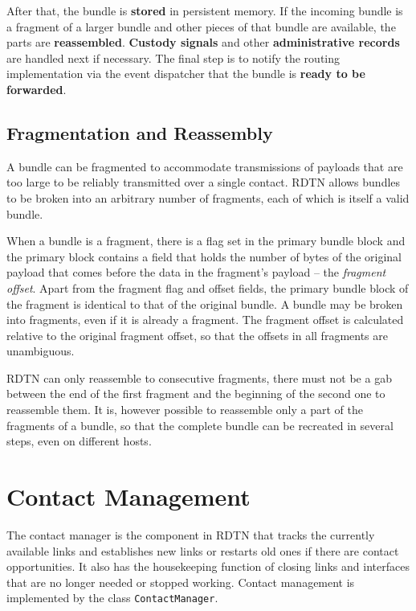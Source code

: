 \documentclass{article}
\begin{document}
After that, the bundle is {\bf stored} in persistent memory. If the incoming
bundle is a fragment of a larger bundle and other pieces of that bundle are
available, the parts are {\bf reassembled}. {\bf Custody signals} and other {\bf
administrative records} are handled next if necessary. The final step is to
notify the routing implementation via the event dispatcher that the bundle is
{\bf ready to be forwarded}.

\subsection{Fragmentation and Reassembly}\label{sec.frag}

A bundle can be fragmented to accommodate transmissions of payloads that are too
large to be reliably transmitted over a single contact. RDTN allows bundles to
be broken into an arbitrary number of fragments, each of which is itself a valid
bundle. 

When a bundle is a fragment, there is a flag set in the primary bundle block and
the primary block contains a field that holds the number of bytes of the
original payload that comes before the data in the fragment's payload -- the
{\em fragment offset}. Apart from the fragment flag and offset fields, the
primary bundle block of the fragment is identical to that of the original
bundle. A bundle may be broken into fragments, even if it is already a fragment.
The fragment offset is calculated relative to the original fragment offset, so
that the offsets in all fragments are unambiguous.

RDTN can only reassemble to consecutive fragments, there must not be a gab
between the end of the first fragment and the beginning of the second one to
reassemble them. It is, however possible to reassemble only a part of the
fragments of a bundle, so that the complete bundle can be recreated in several
steps, even on different hosts.

\section{Contact Management}\label{sec.contact-mngt}

The contact manager is the component in RDTN that tracks the currently available
links and establishes new links or restarts old ones if there are contact
opportunities. It also has the housekeeping function of closing links and
interfaces that are no longer needed or stopped working. Contact management is
implemented by the class {\tt ContactManager}.
\end{document}
